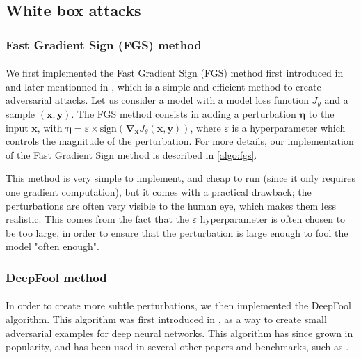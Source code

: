 \documentclass[11pt,twocolumn,letterpaper]{article}
\begin{document}
\subsection{White box attacks}

\subsubsection{Fast Gradient Sign (FGS) method}

\paragraph{} We first implemented the Fast Gradient Sign (FGS) method first introduced in \cite{fast_gradient_sign} and later mentionned in \cite{robustness}, which is a simple and efficient method to create adversarial attacks. Let us consider a model with a model loss function $J_{\theta}$ and a sample $(\bm{x}, \bm{y})$. The FGS method consists in adding a perturbation $\bm{\eta}$ to the input $\bm{x}$, with $\bm{\eta} = \varepsilon \times \text{sign}(\bm{\nabla}_{\bm{x}} J_{\theta}(\bm{x}, \bm{y}))$, where $\varepsilon$ is a hyperparameter which controls the magnitude of the perturbation. For more details, our implementation of the Fast Gradient Sign method is described in \ref{algo:fgs}. 

This method is very simple to implement, and cheap to run (since it only requires one gradient computation), but it comes with a practical drawback; the perturbations are often very visible to the human eye, which makes them less realistic. This comes from the fact that the $\varepsilon$ hyperparameter is often chosen to be too large, in order to ensure that the perturbation is large enough to fool the model "often enough". 

\subsubsection{DeepFool method}

\paragraph{} In order to create more subtle perturbations, we then implemented the DeepFool algorithm. This algorithm was first introduced in \cite{deepfool}, as a way to create small adversarial examples for deep neural networks. This algorithm has since grown in popularity, and has been used in several other papers and benchmarks, such as \cite{robustness}.
\end{document}
